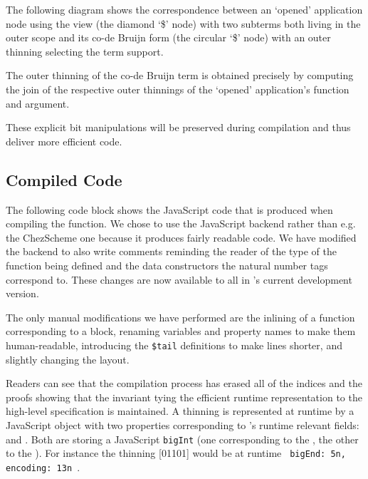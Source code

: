 The following diagram shows the correspondence between an `opened' application node
using the view (the diamond `\$' node) with two subterms both living in the outer scope
and its co-de Bruijn form (the circular `\$' node) with an outer thinning selecting the
term support.

\noindent
\begin{minipage}{.45\textwidth}\center
\end{minipage}\hfill
\begin{minipage}{.45\textwidth}\center
\end{minipage}

The outer thinning of the co-de Bruijn term is obtained precisely by
computing the join of the respective outer thinnings of the `opened'
application's function and argument.

These explicit bit manipulations will be preserved during compilation and
thus deliver more efficient code.


\subsection{Compiled Code}\label{sec:compiledview}

The following code block shows the JavaScript code that is produced when compiling the
 function. We chose to use the JavaScript backend rather than e.g.
the ChezScheme one because it produces fairly readable code.
%
We have modified the backend to also write comments reminding the reader of the type
of the function being defined and the data constructors the natural number tags
correspond to.
%
These changes are now available to all in \idris{}'s current development version.

The only manual modifications we have performed are the inlining of a function
corresponding to a  block, renaming variables and property names
to make them human-readable, introducing the \texttt{\$tail} definitions to make
lines shorter, and slightly changing the layout.



Readers can see that the compilation process has erased all of the indices
and the proofs
showing that the invariant tying the efficient runtime representation to the
high-level specification is maintained.
%
A thinning is represented at runtime by a JavaScript object with two properties
corresponding to 's runtime relevant fields: 
and .
%
Both are storing a JavaScript \texttt{bigInt} (one corresponding to the
, the other to the ).
%
For instance the thinning [01101] would be at runtime
\texttt{{ bigEnd: 5n, encoding: 13n }}.
%

